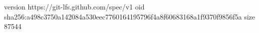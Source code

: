 version https://git-lfs.github.com/spec/v1
oid sha256:a498c3750a142084a530eec7760164195796f4a8f60683168a1f9370f9856f5a
size 87544
